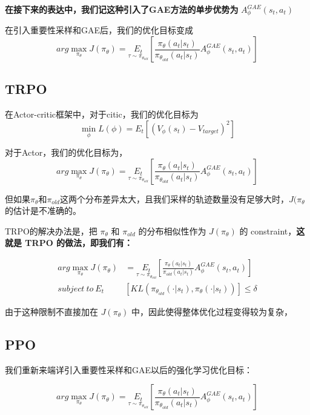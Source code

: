 \documentclass[UTF8,fontset=fandol]{ctexart}
\begin{document}
\textbf{在接下来的表达中，我们记这种引入了GAE方法的单步优势为} \(A_\phi^{GAE}(s_t, a_t)\)

在引入重要性采样和GAE后，我们的优化目标变成\[
arg \max_{\pi_\theta} J(\pi_\theta) = \underset{\tau \sim \pi_{\theta_{old}}}{E_t} \left[ \frac{\pi_\theta(a_t|s_t)}{\pi_{\theta_{old}}(a_t|s_t)} A_\phi^{GAE}(s_t, a_t) \right]
\]

\subsection{TRPO}
在Actor-critic框架中，对于citic，我们的优化目标为\[\min_\phi L(\phi) = E_t \left[ \left( V_\phi(s_t) - V_{target} \right)^2 \right]\]

对于Actor，我们的优化目标为，\[
arg \max_{\pi_\theta} J(\pi_\theta) = \underset{\tau \sim \pi_{\theta_{old}}}{E_t} \left[ \frac{\pi_\theta(a_t|s_t)}{\pi_{\theta_{old}}(a_t|s_t)} A_\phi^{GAE}(s_t, a_t) \right]
\]

但如果\(\pi_\theta\)和\(\pi_{old}\)这两个分布差异太大，且我们采样的轨迹数量没有足够大时，\(J(\pi_\theta\)的估计是不准确的。

TRPO的解决办法是，把 \(\pi_\theta\) 和 \(\pi_{old}\) 的分布相似性作为 \(J(\pi_\theta)\) 的 constraint，\textbf{这就是 TRPO 的做法，即我们有：}

\begin{align*}
arg \max_{\pi_\theta} J(\pi_\theta) &= \underset{\tau \sim \pi_{\theta_{old}}}{E_t} \left[ \frac{\pi_\theta(a_t|s_t)}{\pi_{old}(a_t|s_t)} A_\phi^{GAE}(s_t, a_t) \right] \\[1.5ex]
subject\ to\ E_t &[KL(\pi_{\theta_{old}}(\cdot|s_t), \pi_\theta(\cdot|s_t))] \leq \delta
\end{align*}

由于这种限制不直接加在 \(J(\pi_\theta)\) 中，因此使得整体优化过程变得较为复杂，

\subsection{PPO}
我们重新来端详引入重要性采样和GAE以后的强化学习优化目标：

\[
arg \max_{\pi_\theta} J(\pi_\theta) = \underset{\tau \sim \pi_{\theta_{old}}}{E_t} \left[ \frac{\pi_\theta(a_t|s_t)}{\pi_{\theta_{old}}(a_t|s_t)} A_\phi^{GAE}(s_t, a_t) \right]
\]
\end{document}
